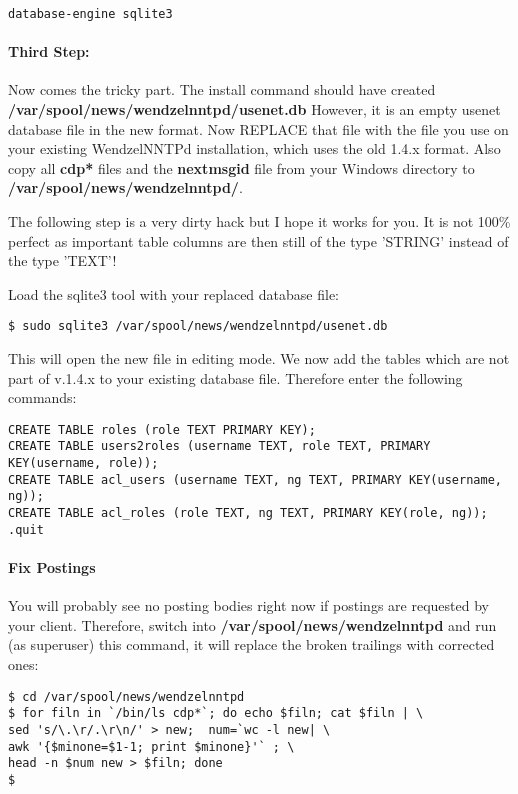 \begin{verbatim}
database-engine sqlite3
\end{verbatim}

\paragraph*{Third Step:}
Now comes the tricky part. The install command should have created
{\bf /var/spool/news/wendzelnntpd/usenet.db}
However, it is an empty usenet database file in the new format.
Now REPLACE that file with the file you use on your existing WendzelNNTPd installation, which uses the old 1.4.x format. Also copy all {\bf cdp*} files and the {\bf nextmsgid} file from your Windows directory to {\bf /var/spool/news/wendzelnntpd/}. 

The following step is a very dirty hack but I hope it works for you. It is not 100\% perfect as important table columns are then still of the type 'STRING' instead of the type 'TEXT'!

Load the sqlite3 tool with your replaced database file:

\begin{verbatim}
$ sudo sqlite3 /var/spool/news/wendzelnntpd/usenet.db
\end{verbatim}

This will open the new file in editing mode. We now add the tables which are not part of v.1.4.x to your existing database file. Therefore enter the following commands:

\begin{verbatim}
CREATE TABLE roles (role TEXT PRIMARY KEY);
CREATE TABLE users2roles (username TEXT, role TEXT, PRIMARY KEY(username, role));
CREATE TABLE acl_users (username TEXT, ng TEXT, PRIMARY KEY(username, ng));
CREATE TABLE acl_roles (role TEXT, ng TEXT, PRIMARY KEY(role, ng));
.quit
\end{verbatim}


\paragraph*{Fix Postings}

You will probably see no posting bodies right now if postings are requested by your client. Therefore, switch into {\bf /var/spool/news/wendzelnntpd} and run (as superuser) this command, it will replace the broken trailings with corrected ones:

\begin{verbatim}
$ cd /var/spool/news/wendzelnntpd 
$ for filn in `/bin/ls cdp*`; do echo $filn; cat $filn | \
sed 's/\.\r/.\r\n/' > new;  num=`wc -l new| \
awk '{$minone=$1-1; print $minone}'` ; \
head -n $num new > $filn; done
$
\end{verbatim}

